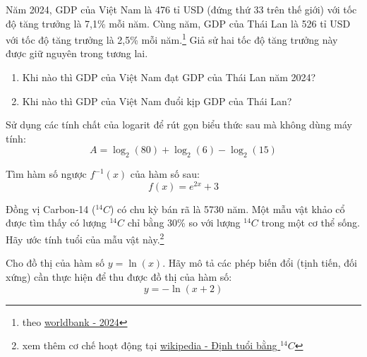 \begin{exercise}
Năm 2024, GDP của Việt Nam là 476 tỉ USD (đứng thứ 33 trên thế giới) với tốc độ tăng trưởng là 7,1\% mỗi năm. Cùng năm, GDP của Thái Lan là 526 tỉ USD với tốc độ tăng trưởng là 2,5\% mỗi năm.\footnote{theo \href{https://datatopics.worldbank.org/world-development-indicators/themes/economy.html}{worldbank - 2024}} Giả sử hai tốc độ tăng trưởng này được giữ nguyên trong tương lai.
    \begin{enumerate}[label=(\alph*)]
        \item Khi nào thì GDP của Việt Nam đạt GDP của Thái Lan năm 2024?
        \item Khi nào thì GDP của Việt Nam đuổi kịp GDP của Thái Lan?
    \end{enumerate}
\end{exercise}


\begin{exercise}
Sử dụng các tính chất của logarit để rút gọn biểu thức sau mà không dùng máy tính:
$$ A = \log_2(80) + \log_2(6) - \log_2(15) $$
\end{exercise}

\begin{exercise}
Tìm hàm số ngược $f^{-1}(x)$ của hàm số sau:
$$ f(x) = e^{2x} + 3 $$
\end{exercise}

\begin{exercise}
Đồng vị Carbon-14 ($^{14}C$) có chu kỳ bán rã là 5730 năm. Một mẫu vật khảo cổ được tìm thấy có lượng $^{14}C$ chỉ bằng 30\% so với lượng $^{14}C$ trong một cơ thể sống. Hãy ước tính tuổi của mẫu vật này.\footnote{xem thêm cơ chế hoạt động tại \href{https://vi.wikipedia.org}{wikipedia - Định tuổi bằng $^{14}C$}}
\end{exercise}

\begin{exercise}
Cho đồ thị của hàm số $y = \ln(x)$. Hãy mô tả các phép biến đổi (tịnh tiến, đối xứng) cần thực hiện để thu được đồ thị của hàm số:
$$ y = -\ln(x+2) $$
\end{exercise}

